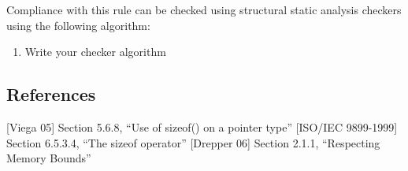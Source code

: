Compliance with this rule can be checked using structural static analysis checkers using the following algorithm:

\begin{enumerate}
\item Write your checker algorithm
\end{enumerate}

\subsection{References}

[Viega 05] Section 5.6.8, ``Use of sizeof() on a pointer type''
[ISO/IEC 9899-1999] Section 6.5.3.4, ``The sizeof operator''
[Drepper 06] Section 2.1.1, ``Respecting Memory Bounds''
